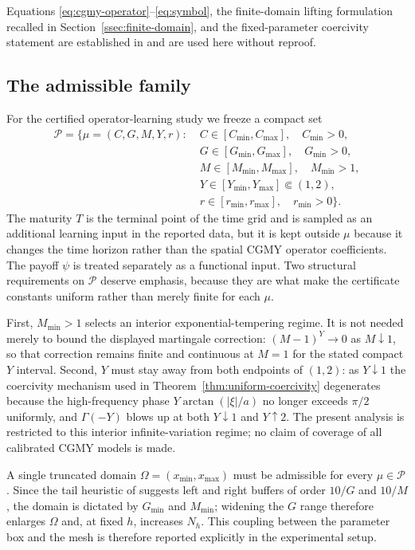 \documentclass[11pt]{amsart}
\theoremstyle{remark}
\newcommand{\Pset}{\mathcal{P}}
\newcommand{\rf}{r}
\begin{document}
Equations \eqref{eq:cgmy-operator}--\eqref{eq:symbol}, the
finite-domain lifting formulation recalled in
Section~\ref{ssec:finite-domain}, and the fixed-parameter coercivity statement
are established in \cite{DamircheliCGMY2026} and are used here without
reproof.

\subsection{The admissible family}
\label{ssec:family}

For the certified operator-learning study we freeze a compact set
\begin{equation}
\begin{aligned}
 \Pset=\bigl\{\mu=(C,G,M,Y,\rf):\;&
 C\in[C_{\min},C_{\max}],\quad C_{\min}>0,\\
 &G\in[G_{\min},G_{\max}],\quad G_{\min}>0,\\
 &M\in[M_{\min},M_{\max}],\quad M_{\min}>1,\\
 &Y\in[Y_{\min},Y_{\max}]\Subset(1,2),\\
 &\rf\in[r_{\min},r_{\max}],\quad r_{\min}>0\bigr\}.
\end{aligned}
 \label{eq:parameter-set}
\end{equation}
The maturity $T$ is the terminal point of the time grid and is sampled as an
additional learning input in the reported data, but it is kept outside
$\mu$ because it changes the time horizon rather than the spatial CGMY
operator coefficients.  The payoff $\psi$ is treated separately as a
functional input.  Two structural requirements on
$\Pset$ deserve emphasis, because they are what make the certificate constants
uniform rather than merely finite for each $\mu$.

First, $M_{\min}>1$ selects an interior exponential-tempering regime.
It is not needed merely to bound the displayed martingale correction:
$(M-1)^Y\to0$ as $M\downarrow1$, so that correction remains finite
and continuous at $M=1$ for the stated compact $Y$ interval.  Second, $Y$ must stay away from both endpoints of
$(1,2)$: as $Y\downarrow1$ the coercivity mechanism used in
Theorem~\ref{thm:uniform-coercivity} degenerates because the high-frequency
phase $Y\arctan(|\xi|/a)$ no longer exceeds $\pi/2$ uniformly, and $\Gamma(-Y)$ blows up at both $Y\downarrow1$ and $Y\uparrow2$.  The present analysis is restricted to this interior infinite-variation
regime; no claim of coverage of all calibrated CGMY models is made.

A single truncated domain $\Omega=(x_{\min},x_{\max})$ must be admissible for
every $\mu\in\Pset$.  Since the tail heuristic of \cite{DamircheliCGMY2026}
suggests left and right buffers of order $10/G$ and $10/M$, the domain is
dictated by $G_{\min}$ and $M_{\min}$; widening the $G$ range therefore
enlarges $\Omega$ and, at fixed $h$, increases $N_h$.  This coupling between the parameter box and the mesh is therefore reported
explicitly in the experimental setup.
\end{document}
